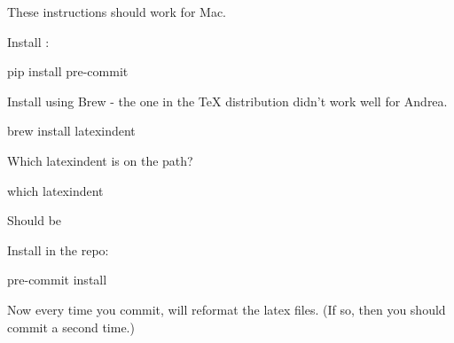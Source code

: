 These instructions should work for Mac.

Install :
%
\begin{console}
    pip install pre-commit
\end{console}
%

Install  using Brew - the one in the TeX distribution didn't work well for Andrea.
%
\begin{console}
    brew install latexindent
\end{console}
%
Which latexindent is on the path?
%
\begin{console}
    which latexindent
\end{console}
%
Should be 

Install  in the repo:
%
\begin{console}
    pre-commit install
\end{console}
%
Now every time you commit,  will reformat the latex files.
(If so, then you should commit a second time.)
